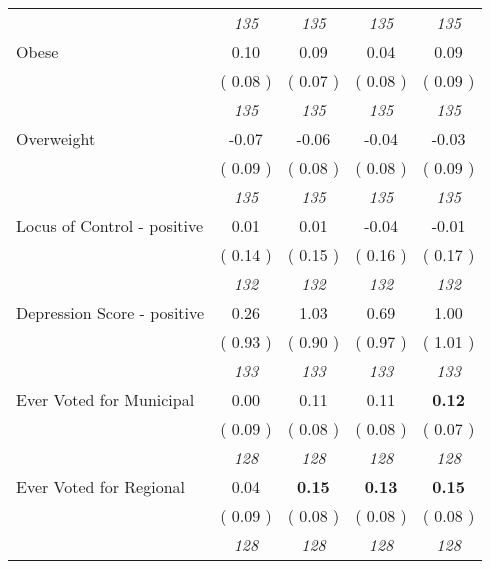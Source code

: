 \begin{tabular}{l c c c c}
& \textit{ 135 } & \textit{ 135 } & \textit{ 135 } & \textit{ 135 } \\
Obese &      0.10 &      0.09 &      0.04 &      0.09 \\
& (     0.08 ) & (     0.07 ) & (     0.08 ) & (     0.09 ) \\
& \textit{ 135 } & \textit{ 135 } & \textit{ 135 } & \textit{ 135 } \\
Overweight &     -0.07 &     -0.06 &     -0.04 &     -0.03 \\
& (     0.09 ) & (     0.08 ) & (     0.08 ) & (     0.09 ) \\
& \textit{ 135 } & \textit{ 135 } & \textit{ 135 } & \textit{ 135 } \\
Locus of Control - positive &      0.01 &      0.01 &     -0.04 &     -0.01 \\
& (     0.14 ) & (     0.15 ) & (     0.16 ) & (     0.17 ) \\
& \textit{ 132 } & \textit{ 132 } & \textit{ 132 } & \textit{ 132 } \\
Depression Score - positive &      0.26 &      1.03 &      0.69 &      1.00 \\
& (     0.93 ) & (     0.90 ) & (     0.97 ) & (     1.01 ) \\
& \textit{ 133 } & \textit{ 133 } & \textit{ 133 } & \textit{ 133 } \\
Ever Voted for Municipal &      0.00 &      0.11 &      0.11 & \textbf{     0.12} \\
& (     0.09 ) & (     0.08 ) & (     0.08 ) & (     0.07 ) \\
& \textit{ 128 } & \textit{ 128 } & \textit{ 128 } & \textit{ 128 } \\
Ever Voted for Regional &      0.04 & \textbf{      0.15 } & \textbf{      0.13 } & \textbf{     0.15} \\
& (     0.09 ) & (     0.08 ) & (     0.08 ) & (     0.08 ) \\
& \textit{ 128 } & \textit{ 128 } & \textit{ 128 } & \textit{ 128 } \\
\bottomrule
\end{tabular}
